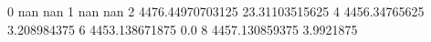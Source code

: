 0 nan nan
1 nan nan
2 4476.44970703125 23.31103515625
4 4456.34765625 3.208984375
6 4453.138671875 0.0
8 4457.130859375 3.9921875
